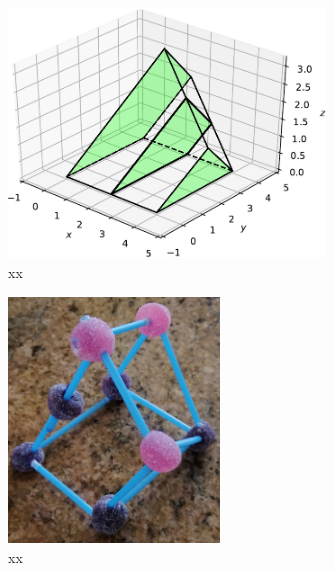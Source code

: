 \documentclass{article}
\theoremstyle{theorem}
\theoremstyle{definition}
\begin{document}
\begin{figure}[htb]
\centering
\includegraphics[width=0.75\textwidth]{prismatoid.pdf}
\caption{xx}
\label{fig:prismatoid}
\end{figure}

\begin{figure}[htb]
\centering
\includegraphics[width=0.5\textwidth]{prismatoid_real.jpg}
\caption{xx}
\label{fig:prismatoid_real}
\end{figure}
\end{document}
